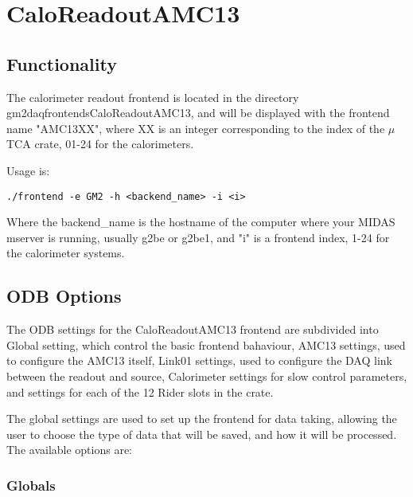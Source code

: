 \section{CaloReadoutAMC13}

\subsection{Functionality}

The calorimeter readout frontend is located in the directory gm2daq\/frontends\/CaloReadoutAMC13, and will be displayed with the frontend name "AMC13XX", where XX is an integer corresponding to the index of the $\mu$TCA crate, 01-24 for the calorimeters. 

Usage is:

\begin{verbatim}
./frontend -e GM2 -h <backend_name> -i <i>
\end{verbatim}

Where the backend\_name is the hostname of the computer where your MIDAS mserver is running, usually g2be or g2be1, and "i" is a frontend index, 1-24 for the calorimeter systems.

\subsection{ODB Options}

The ODB settings for the CaloReadoutAMC13 frontend are subdivided into Global setting, which control the basic frontend bahaviour, AMC13 settings, used to configure the AMC13 itself, Link01 settings, used to configure the DAQ link between the readout and source, Calorimeter settings for slow control parameters, and settings for each of the 12 Rider slots in the crate.

The global settings are used to set up the frontend for data taking, allowing the user to choose the type of data that will be saved, and how it will be processed. The available options are:

\subsubsection{Globals}


